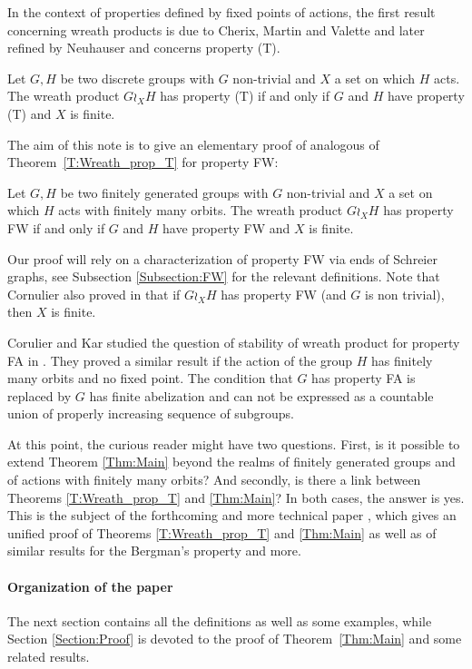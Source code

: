 In the context of properties defined by fixed points of actions, the first result concerning wreath products is due to Cherix, Martin and Valette and later refined by Neuhauser and concerns property (T).
%
%
\begin{thm} \label{T:Wreath_prop_T}
Let $G,H$ be two discrete groups with $G$ non-trivial and $X$ a set on which $H$ acts. The wreath product $G \wr_X H$ has property (T) if and only if $G$ and $H$ have property (T) and $X$ is finite.
\end{thm}
%
%
The aim of this note is to give an elementary proof of analogous of Theorem~\ref{T:Wreath_prop_T} for property FW:
%
%
\begin{thm}\label{Thm:Main}
Let $G,H$ be two finitely generated groups with $G$ non-trivial and $X$ a set on which $H$ acts with finitely many orbits. The wreath product $G \wr_X H$ has property FW if and only if $G$ and $H$ have property FW and $X$ is finite.
\end{thm}
%
%
Our proof will rely on a characterization of property FW via ends of Schreier graphs, see Subsection \ref{Subsection:FW} for the relevant definitions.
Note that Cornulier also proved in \cite{Cornulier2013} that if $G\wr_XH$ has property FW (and $G$ is non trivial), then $X$ is finite.

Corulier and Kar studied the question of stability of wreath product for property FA in \cite{Cornulier2011}. They proved a similar result if the action of the group $H$ has finitely many orbits and no fixed point. The condition that $G$ has property FA is replaced by $G$ has finite abelization and can not be expressed as a countable union of properly increasing sequence of subgroups. 


At this point, the curious reader might have two questions. First, is it possible to extend Theorem \ref{Thm:Main} beyond the realms of finitely generated groups and of actions with finitely many orbits? And secondly, is there a link between Theorems \ref{T:Wreath_prop_T} and \ref{Thm:Main}?
In both cases, the answer is yes.
This is the subject of the forthcoming and more technical paper \cite{LS2021}, which gives an unified proof of Theorems \ref{T:Wreath_prop_T} and \ref{Thm:Main} as well as of similar results for the Bergman's property and more.
%
%
%
%
\paragraph{Organization of the paper}
The next section contains all the definitions as well as some examples, while Section \ref{Section:Proof} is devoted to the proof of Theorem~\ref{Thm:Main} and some related results.
%
%
%
